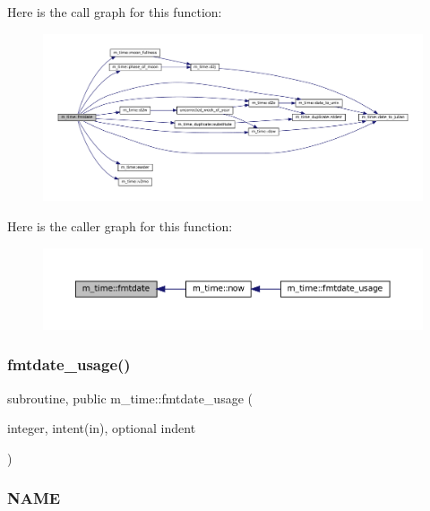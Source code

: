 Here is the call graph for this function\+:\nopagebreak
\begin{figure}[H]
\begin{center}
\leavevmode
\includegraphics[width=350pt]{namespacem__time_a2cb84c9b8af4f395b76aed76e1431328_cgraph}
\end{center}
\end{figure}
Here is the caller graph for this function\+:\nopagebreak
\begin{figure}[H]
\begin{center}
\leavevmode
\includegraphics[width=350pt]{namespacem__time_a2cb84c9b8af4f395b76aed76e1431328_icgraph}
\end{center}
\end{figure}
\mbox{\label{namespacem__time_a914927f70fb9495af1be2e484b967111}} 
\subsubsection{\texorpdfstring{fmtdate\+\_\+usage()}{fmtdate\_usage()}}
{\footnotesize\ttfamily subroutine, public m\+\_\+time\+::fmtdate\+\_\+usage (\begin{DoxyParamCaption}\item[{integer, intent(in), optional}]{indent }\end{DoxyParamCaption})}



\subsubsection*{N\+A\+ME}

